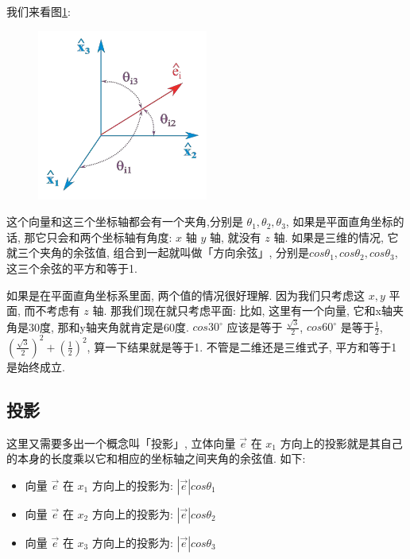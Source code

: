 我们来看图\ref{fig:img12_5}: 

\begin{figure}[ht]
  \centering
  \includegraphics[width=0.5\textwidth]{asset/20230901155252.png}
  \caption{}
  \label{fig:img12_5}
\end{figure}

这个向量和这三个坐标轴都会有一个夹角,分别是 $\theta_1, \theta_2, \theta_3$, 如果是平面直角坐标的话, 那它只会和两个坐标轴有角度: $x$ 轴 $y$ 轴, 就没有 $z$ 轴. 如果是三维的情况, 它就三个夹角的余弦值, 组合到一起就叫做「方向余弦」, 分别是$cos \theta_1, cos \theta_2, cos \theta_3$, 这三个余弦的平方和等于1. 

如果是在平面直角坐标系里面, 两个值的情况很好理解. 因为我们只考虑这 $x, y$ 平面, 而不考虑有 $z$ 轴. 那我们现在就只考虑平面: 比如, 这里有一个向量, 它和x轴夹角是30度, 那和y轴夹角就肯定是60度. $cos30^\circ$ 应该是等于 $\frac {\sqrt 3}{2}$, $cos 60^\circ$ 是等于$\frac{1}{2}$, $(\frac{\sqrt 3}{2})^2 + (\frac{1}{2})^2$, 算一下结果就是等于1. 不管是二维还是三维式子, 平方和等于1是始终成立. 

\subsection{投影}

这里又需要多出一个概念叫「投影」, 立体向量 $\vec e$ 在 $x_1$ 方向上的投影就是其自己的本身的长度乘以它和相应的坐标轴之间夹角的余弦值. 如下: 

\begin{itemize}
  \item 向量 $\vec e$ 在 $x_1$ 方向上的投影为: $|\vec e| cos \theta_1$ 
  \item 向量 $\vec e$ 在 $x_2$ 方向上的投影为: $|\vec e| cos \theta_2$ 
  \item 向量 $\vec e$ 在 $x_3$ 方向上的投影为: $|\vec e| cos \theta_3$ 
\end{itemize}

